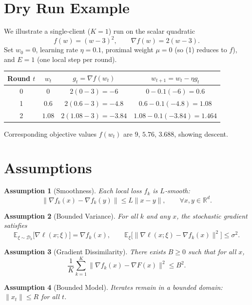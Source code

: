 \documentclass{article}
\newtheorem{assumption}{Assumption}
\begin{document}
\section*{Dry Run Example}
We illustrate a single‑client ($K=1$) run on the scalar quadratic
\[
f(w)=(w-3)^{2},\qquad \nabla f(w)=2(w-3).
\]
Set $w_0=0$, learning rate $\eta=0.1$, proximal weight $\mu=0$ (so (1) reduces to $f$), and $E=1$ (one local step per round).  

\begin{center}
\begin{tabular}{c|c|c|c}
\textbf{Round $t$} & $w_t$ & $g_t=\nabla f(w_t)$ & $w_{t+1}=w_t-\eta g_t$\\ \hline
0 & $0$ & $2(0-3)=-6$ & $0-0.1(-6)=0.6$\\
1 & $0.6$ & $2(0.6-3)=-4.8$ & $0.6-0.1(-4.8)=1.08$\\
2 & $1.08$ & $2(1.08-3)=-3.84$ & $1.08-0.1(-3.84)=1.464$\\
\end{tabular}
\end{center}
Corresponding objective values $f(w_t)$ are $9$, $5.76$, $3.688$, showing descent.

\newpage

\section*{Assumptions}
\begin{assumption}[Smoothness]\label{as:smooth}
Each local loss $f_k$ is $L$‑smooth:
\[
\|\nabla f_k(x)-\nabla f_k(y)\|\le L\|x-y\|,\qquad\forall x,y\in\mathbb{R}^d.
\]
\end{assumption}

\begin{assumption}[Bounded Variance]\label{as:var}
For all $k$ and any $x$, the stochastic gradient satisfies
\[
\mathbb{E}_{\xi\sim\mathcal{D}_k}\big[\nabla\ell(x;\xi)\big]=\nabla f_k(x),\qquad
\mathbb{E}_{\xi}\big[\|\nabla\ell(x;\xi)-\nabla f_k(x)\|^{2}\big]\le\sigma^{2}.
\]
\end{assumption}

\begin{assumption}[Gradient Dissimilarity]\label{as:disp}
There exists $B\ge0$ such that for all $x$,
\[
\frac{1}{K}\sum_{k=1}^{K}\|\nabla f_k(x)-\nabla F(x)\|^{2}\le B^{2}.
\]
\end{assumption}

\begin{assumption}[Bounded Model]\label{as:bound}
Iterates remain in a bounded domain: $\|x_t\|\le R$ for all $t$.
\end{assumption}
\end{document}

